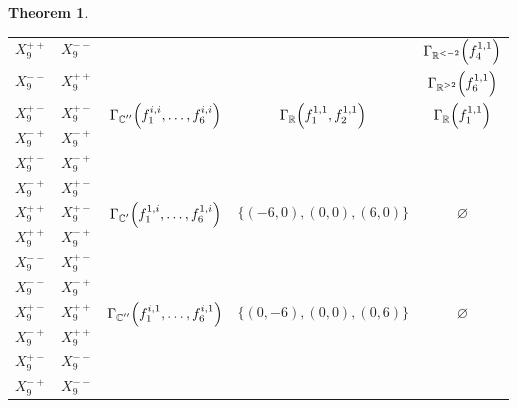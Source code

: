 \documentclass[noend]{amsproc}
\newtheorem{theorem}{Theorem}
\theoremstyle{definition}
\let\originalleft\left
\let\originalright\right
\renewcommand{\left}{\mathopen{}\mathclose\bgroup\originalleft}
\renewcommand{\right}{\aftergroup\egroup\originalright}
\DeclareMathOperator{\R}{\mathbb{R}}
\DeclareMathOperator{\C}{\mathbb{C}}
\begin{document}
\begin{theorem}
\begin{table}[!htbp]
\begin{tabular}{|c|c||c|c|c|}
$X_9^{++}$ & $X_9^{--}$ &&&
$\Gamma_{\R^{<-2}}\left(f_4^{1,1}\right)$\specialvrule
\\ \cline{1-2}\cline{5-5}

$X_9^{--}$ & $X_9^{++}$ &&&
$\Gamma_{\R^{>2}}\left(f_6^{1,1}\right)$\specialvrule
\\ \hline


$X_9^{+-}$ & $X_9^{+-}$ &
\multirow{4}{*}{$\Gamma_{\C''}\left(f_1^{i,i}, \ldots, f_6^{i,i}\right)$} &
\multirow{4}{*}{$\Gamma_{\R}\left(f_1^{1,1}, f_2^{1,1}\right)$} &
\multirow{4}{*}{$\Gamma_{\R}\left(f_1^{1,1}\right)$} \\ \cline{1-2}

$X_9^{-+}$ & $X_9^{-+}$ &&& \\ \cline{1-2}

$X_9^{+-}$ & $X_9^{-+}$ &&& \\ \cline{1-2}

$X_9^{-+}$ & $X_9^{+-}$ &&& \\ \hline


$X_9^{++}$ & $X_9^{+-}$ &
\multirow{4}{*}{$\Gamma_{\C'}\left(f_1^{1,i}, \ldots, f_6^{1,i}\right)$} &
\multirow{4}{*}{$\{(-6,0), (0,0), (6,0)\}$} &
\multirow{4}{*}{$\varnothing$} \\ \cline{1-2}

$X_9^{++}$ & $X_9^{-+}$ &&& \\ \cline{1-2}

$X_9^{--}$ & $X_9^{+-}$ &&& \\ \cline{1-2}

$X_9^{--}$ & $X_9^{-+}$ &&& \\ \hline


$X_9^{+-}$ & $X_9^{++}$ &
\multirow{4}{*}{$\Gamma_{\C''}\left(f_1^{i,1}, \ldots, f_6^{i,1}\right)$} &
\multirow{4}{*}{$\{(0,-6), (0,0), (0,6)\}$} &
\multirow{4}{*}{$\varnothing$} \\ \cline{1-2}

$X_9^{-+}$ & $X_9^{++}$ &&& \\ \cline{1-2}

$X_9^{+-}$ & $X_9^{--}$ &&& \\ \cline{1-2}

$X_9^{-+}$ & $X_9^{--}$ &&& \\ \hline
\end{tabular}
\end{table}

\end{theorem}
\end{document}
